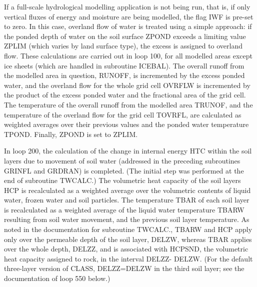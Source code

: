 If a full-\/scale hydrological modelling application is not being run, that is, if only vertical fluxes of energy and moisture are being modelled, the flag I\+W\+F is pre-\/set to zero. In this case, overland flow of water is treated using a simple approach\+: if the ponded depth of water on the soil surface Z\+P\+O\+N\+D exceeds a limiting value Z\+P\+L\+I\+M (which varies by land surface type), the excess is assigned to overland flow. These calculations are carried out in loop 100, for all modelled areas except ice sheets (which are handled in subroutine I\+C\+E\+B\+A\+L). The overall runoff from the modelled area in question, R\+U\+N\+O\+F\+F, is incremented by the excess ponded water, and the overland flow for the whole grid cell O\+V\+R\+F\+L\+W is incremented by the product of the excess ponded water and the fractional area of the grid cell. The temperature of the overall runoff from the modelled area T\+R\+U\+N\+O\+F, and the temperature of the overland flow for the grid cell T\+O\+V\+R\+F\+L, are calculated as weighted averages over their previous values and the ponded water temperature T\+P\+O\+N\+D. Finally, Z\+P\+O\+N\+D is set to Z\+P\+L\+I\+M.

In loop 200, the calculation of the change in internal energy H\+T\+C within the soil layers due to movement of soil water (addressed in the preceding subroutines G\+R\+I\+N\+F\+L and G\+R\+D\+R\+A\+N) is completed. (The initial step was performed at the end of subroutine T\+W\+C\+A\+L\+C.) The volumetric heat capacity of the soil layers H\+C\+P is recalculated as a weighted average over the volumetric contents of liquid water, frozen water and soil particles. The temperature T\+B\+A\+R of each soil layer is recalculated as a weighted average of the liquid water temperature T\+B\+A\+R\+W resulting from soil water movement, and the previous soil layer temperature. As noted in the documentation for subroutine T\+W\+C\+A\+L\+C., T\+B\+A\+R\+W and H\+C\+P apply only over the permeable depth of the soil layer, D\+E\+L\+Z\+W, whereas T\+B\+A\+R applies over the whole depth, D\+E\+L\+Z\+Z, and is associated with H\+C\+P\+S\+N\+D, the volumetric heat capacity assigned to rock, in the interval D\+E\+L\+Z\+Z-\/ D\+E\+L\+Z\+W. (For the default three-\/layer version of C\+L\+A\+S\+S, D\+E\+L\+Z\+Z=D\+E\+L\+Z\+W in the third soil layer; see the documentation of loop 550 below.)

